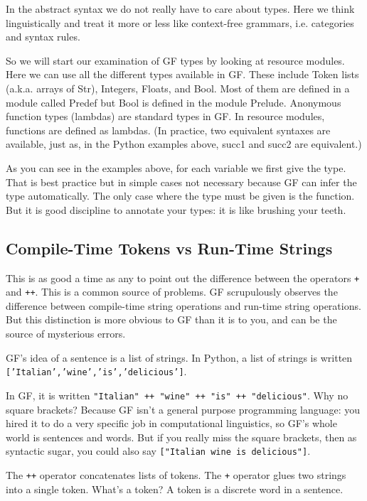 \documentclass{scrartcl}
\begin{document}
In the abstract syntax we do not really have to care about types. Here we think linguistically and treat it more or less like context-free grammars, i.e. categories and syntax rules.

So we will start our examination of GF types by looking at resource modules. Here we can use all the different types available in GF. These include Token lists (a.k.a. arrays of Str), Integers, Floats, and Bool. Most of them are defined in a module called Predef but Bool is defined in the module Prelude. Anonymous function types (lambdas) are standard types in GF. In resource modules, functions are defined as lambdas. (In practice, two equivalent syntaxes are available, just as, in the Python examples above, succ1 and succ2 are equivalent.)



As you can see in the examples above, for each variable we first give the type. That is best practice but in simple cases not necessary because GF can infer the type automatically. The only case where the type must be given is the function. But it is good discipline to annotate your types: it is like brushing your teeth.

\subsection{Compile-Time Tokens vs Run-Time Strings}

This is as good a time as any to point out the difference between the operators \texttt{+} and \texttt{++}. This is a common source of problems. GF scrupulously observes the difference between compile-time string operations and run-time string operations. But this distinction is more obvious to GF than it is to you, and can be the source of mysterious errors.

GF's idea of a sentence is a list of strings. In Python, a list of strings is written \texttt{['Italian','wine','is','delicious']}.

In GF, it is written \texttt{"Italian" ++ "wine" ++ "is" ++ "delicious"}. Why no square brackets? Because GF isn't a general purpose programming language: you hired it to do a very specific job in computational linguistics, so GF's whole world is sentences and words. But if you really miss the square brackets, then as syntactic sugar, you could also say \texttt{["Italian wine is delicious"]}.

The \texttt{++} operator concatenates lists of tokens. The \texttt{+} operator glues two strings into a single token. What's a token? A token is a discrete word in a sentence.
\end{document}
